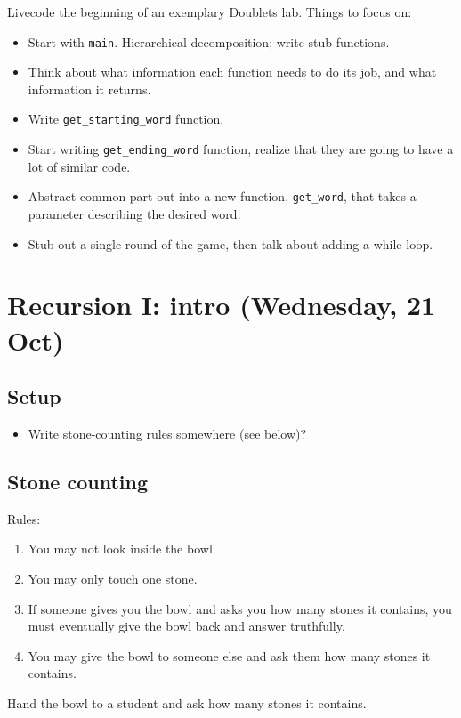 \documentclass{article}
\begin{document}
Livecode the beginning of an exemplary Doublets lab.  Things to focus
on:
\begin{itemize}
\item Start with \verb|main|.  Hierarchical decomposition; write stub
  functions.
\item Think about what information each function needs to do its job,
  and what information it returns.
\item Write \verb|get_starting_word| function.
\item Start writing \verb|get_ending_word| function, realize that they
  are going to have a lot of similar code.
\item Abstract common part out into a new function, \verb|get_word|,
  that takes a parameter describing the desired word.
\item Stub out a single round of the game, then talk about adding a
  while loop.
\end{itemize}

\section*{Recursion I: intro (Wednesday, 21 Oct)}

\subsection*{Setup}
\begin{itemize}
\item Write stone-counting rules somewhere (see below)?
\end{itemize}

\subsection*{Stone counting}

Rules:
\begin{enumerate}
\item You may not look inside the bowl.
\item You may only touch one stone.
\item If someone gives you the bowl and asks you how many stones it
  contains, you must eventually give the bowl back and answer
  truthfully.
\item You may give the bowl to someone else and ask them how many
  stones it contains.
\end{enumerate}
Hand the bowl to a student and ask how many stones it contains.
\end{document}
